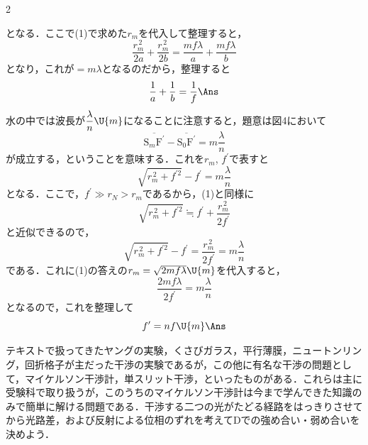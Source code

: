 \begin{multicols}{2}
\begin{komon}
       となる．ここで(1)で求めた$r_m$を代入して整理すると，
       \[\frac{r_m^{\,2}}{2a}+\frac{r_m^{\,2}}{2b}=\frac{mf\lambda}{a}+\frac{mf\lambda}{b}\]
       となり，これが$=m\lambda$となるのだから，整理すると
       \[\frac{1}{a}+\frac{1}{b}=\frac{1}{f}\Ans\]
 水の中では波長が$\dfrac{\lambda}{n}\U{m}$になることに注意すると，題意は図4において
       \[\overline{\mathrm{S}_m\mathrm{F^\prime}}-\overline{\mathrm{S_0F^\prime}}=m\frac{\lambda}{n}\]
       が成立する，ということを意味する．これを$r_m$, $f^\prime$で表すと
       \[\sqrt{r_m^{\,2}+f^{\prime 2}}-f^\prime=m\frac{\lambda}{n}\]
       となる．ここで，$f^\prime\gg r_N>r_m$であるから，(1)と同様に
       \[\sqrt{r_m^{\,2}+f^{\prime 2}}\fallingdotseq f^\prime+\frac{r_m^{\,2}}{2f^\prime}\]
       と近似できるので，
       \[\sqrt{r_m^{\,2}+f^{\prime 2}}-f^\prime=\frac{r_m^{\,2}}{2f^\prime}=m\frac{\lambda}{n}\]
       である．これに(1)の答えの$r_m=\sqrt{2mf\lambda}\U{m}$を代入すると，
       \[\frac{2mf\lambda}{2f^\prime}=m\frac{\lambda}{n}\]
       となるので，これを整理して
       \[f^\prime=nf\U{m}\Ans\]
\end{komon}

\par\nopagebreak
\begin{sisin}
テキストで扱ってきたヤングの実験，くさびガラス，平行薄膜，ニュートンリング，回折格子が主だった干渉の実験であるが，この他に有名な干渉の問題として，マイケルソン干渉計，単スリット干渉，といったものがある．これらは主に受験科で取り扱うが，このうちのマイケルソン干渉計は今まで学んできた知識のみで簡単に解ける問題である．干渉する二つの光がたどる経路をはっきりさせてから光路差，および反射による位相のずれを考えて$\mathrm{D}$での強め合い・弱め合いを決めよう．


\end{sisin}
\end{multicols}
